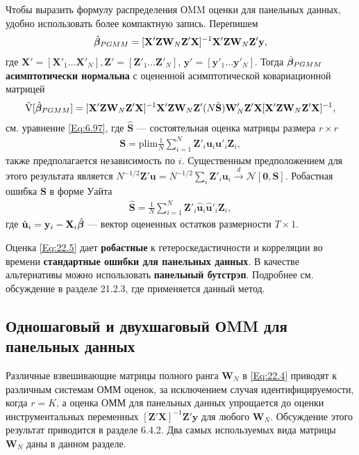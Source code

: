 Чтобы выразить формулу распределения ОMM оценки для панельных данных, удобно использовать более компактную запись. Перепишем
\begin{align}
\hat{\bm{\beta}}_{PGMM}=[\mathbf X' \mathbf Z \mathbf W_N \mathbf Z' \mathbf X]^{-1} \mathbf X' \mathbf Z \mathbf W_N \mathbf Z' \mathbf y,
\label{Eq:22.4}
\end{align}
где  $\mathbf X'=[\mathbf X'_1 \dots \mathbf X'_N], \mathbf Z'=[\mathbf Z'_1 \dots \mathbf Z'_N]$, $\mathbf y'=[\mathbf y'_1 \dots \mathbf y'_N]$. Тогда $\hat{\bm{\beta}}_{PGMM}$ \textbf{асимптотически нормальна}  с оцененной асимптотической ковариационной матрицей
\begin{align}
\hat{\mathrm{V}} [\hat{\bm{\beta}}_{PGMM}]=[\mathbf X' \mathbf Z \mathbf W_N \mathbf Z' \mathbf X]^{-1} \mathbf X' \mathbf Z \mathbf W_N \mathbf Z' 
(N \hat{\mathbf S}) \mathbf W'_N \mathbf Z' \mathbf X
[\mathbf X' \mathbf Z \mathbf W_N \mathbf Z' \mathbf X]^{-1},
\label{Eq:22.5}
\end{align}
см. уравнение \ref{Eq:6.97}, где $\hat{\mathbf S}$ --- состоятельная оценка матрицы размера $r \times r$ 
\begin{align}
\mathbf S =\mathrm{plim} \frac{1}{N} \sum^N_{i=1} \mathbf Z'_i \mathbf u_i \mathbf u'_i \mathbf Z_i,
\label{Eq:22.6}
\end{align}
 также предполагается независимость по $i$. Существенным предположением для этого результата является $N^{-1/2} \mathbf Z' \mathbf u = N^{-1/2} \sum_i \mathbf Z'_i \mathbf u_i \overset{d}\rightarrow \mathcal N[\mathbf 0, \mathbf S]$. Робастная ошибка $\mathbf S$ в форме Уайта  
\begin{align}
\hat{\mathbf S} = \frac{1}{N} \sum^N_{i=1} \mathbf Z'_i \hat{\mathbf u}_i \hat{\mathbf u}'_i \mathbf Z_i,
\label{Eq:22.7}
\end{align}
где  $\hat{\mathbf u}_i=\mathbf y_i- \mathbf X_i \hat{\bm{\beta}}$ --- вектор оцененных остатков размерности $T \times 1$. 

Оценка \ref{Eq:22.5} дает \textbf{робастные} к гетероскедастичности и корреляции во времени \textbf{стандартные ошибки для панельных данных}. В качестве альтернативы можно использовать \textbf{панельный бутстрэп}. Подробнее см. обсуждение в разделе 21.2.3, где  применяется данный метод.

\subsection{Одношаговый и двухшаговый ОMM для панельных данных}

Различные взвешивающие матрицы полного ранга $\mathbf W_N$ в \ref{Eq:22.4} приводят к различным системам ОММ оценок, за исключением случая идентифицируемости, когда $r=K$, а оценка ОММ для панельных данных упрощается до оценки инструментальных переменных $[\mathbf Z' \mathbf X]^{-1}\mathbf Z'\mathbf y$ для любого $\mathbf W_N$. Обсуждение этого результат приводится в разделе 6.4.2. Два самых используемых вида матрицы $\mathbf W_N$ даны в данном разделе.

